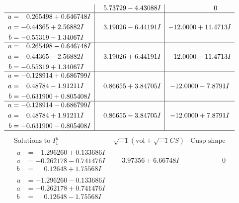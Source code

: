 \documentclass[1p]{elsarticle_modified}
\theoremstyle{definition}
\newcommand{\I}{\sqrt{-1}}
\begin{document}
$$\begin{array}{c|c|c}
 & \phantom{-}5.73729 - 4.43088 I & \phantom{-0.000000 } 0 \\ \hline\begin{aligned}
u &= \phantom{-}0.265498 + 0.646748 I \\
a &= -0.44365 + 2.56882 I \\
b &= -0.55319 - 1.34067 I\end{aligned}
 & \phantom{-}3.19026 - 6.44191 I & -12.0000 + 11.4713 I \\ \hline\begin{aligned}
u &= \phantom{-}0.265498 - 0.646748 I \\
a &= -0.44365 - 2.56882 I \\
b &= -0.55319 + 1.34067 I\end{aligned}
 & \phantom{-}3.19026 + 6.44191 I & -12.0000 - 11.4713 I \\ \hline\begin{aligned}
u &= -0.128914 + 0.686799 I \\
a &= \phantom{-}0.48784 - 1.91211 I \\
b &= -0.631900 + 0.805408 I\end{aligned}
 & \phantom{-}0.86655 + 3.84705 I & -12.0000 - 7.8791 I \\ \hline\begin{aligned}
u &= -0.128914 - 0.686799 I \\
a &= \phantom{-}0.48784 + 1.91211 I \\
b &= -0.631900 - 0.805408 I\end{aligned}
 & \phantom{-}0.86655 - 3.84705 I & -12.0000 + 7.8791 I\\
 \hline 
 \end{array}$$\newpage$$\begin{array}{c|c|c}  
\text{Solutions to }I^u_{1}& \I (\text{vol} + \sqrt{-1}CS) & \text{Cusp shape}\\
 \hline 
\begin{aligned}
u &= -1.296260 + 0.133686 I \\
a &= -0.262178 - 0.741476 I \\
b &= \phantom{-}0.12648 + 1.75568 I\end{aligned}
 & \phantom{-}3.97356 + 6.66748 I & \phantom{-0.000000 } 0 \\ \hline\begin{aligned}
u &= -1.296260 - 0.133686 I \\
a &= -0.262178 + 0.741476 I \\
b &= \phantom{-}0.12648 - 1.75568 I\end{aligned}

\end{array}$$
\end{document}
